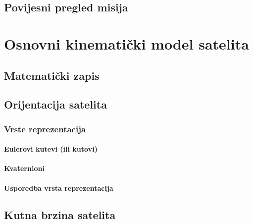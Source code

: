 \documentclass[times, utf8, diplomski, numeric]{templates/template}
\begin{document}
{    \section{Povijesni pregled misija}{
        \iffalse
        - navesti neke komercijalne primjene do sada
        - navesti znanstvene misije do sada
        \fi
    }
}


\chapter{Osnovni kinematički model satelita}{
    \section{Matematički zapis}{
        \iffalse
        - objasniti sve parametre kinematickog modela satelita
        - objasniti pojednostavljenja
        - objasniti odredjivanje parametara
        \fi
    }
    
    \section{Orijentacija satelita}{   
        \subsection{Vrste reprezentacija}{
            \subsubsection{Eulerovi kutevi (ili kutovi)}{

            }

            \subsubsection{Kvaternioni}{

            }

            \subsubsection{Usporedba vrsta reprezentacija}{
    
            }
        }
    }
    
    \section{Kutna brzina satelita}{
        \iffalse
        - sto je kutna brzina satelita
        - kako ju reprezentiramo
            - promjena eulerovih kuteva
            - promjena kvaterniona
        \fi
    }
}
    
\end{document}
